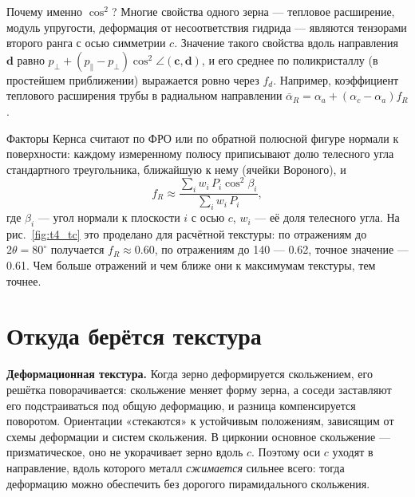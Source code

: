 
Почему именно $\cos^2$? Многие свойства одного зерна --- тепловое расширение, модуль упругости, деформация от
несоответствия гидрида --- являются тензорами второго ранга с осью симметрии $c$. Значение такого свойства вдоль
направления $\mathbf d$ равно $p_\perp + (p_\parallel - p_\perp)\cos^2\angle(\mathbf c,\mathbf d)$, и его среднее по
поликристаллу (в простейшем приближении) выражается ровно через $f_d$. Например, коэффициент теплового расширения
трубы в радиальном направлении $\bar\alpha_R = \alpha_a + (\alpha_c - \alpha_a)f_R$.

Факторы Кернса считают по ФРО или по обратной полюсной фигуре нормали к поверхности: каждому измеренному полюсу
приписывают долю телесного угла стандартного треугольника, ближайшую к нему (ячейки Вороного), и
\begin{equation}
f_R \approx \frac{\sum_i w_i\,P_i\cos^2\beta_i}{\sum_i w_i\,P_i},
\end{equation}
где $\beta_i$ --- угол нормали к плоскости $i$ с осью $c$, $w_i$ --- её доля телесного угла. На рис.~\ref{fig:t4_tc} это
проделано для расчётной текстуры: по отражениям до $2\theta = 80^\circ$ получается $f_R\approx0.60$, по отражениям до
140\textdegree{} --- 0.62, точное значение --- 0.61. Чем больше отражений и чем ближе они к максимумам текстуры, тем точнее.


\section{Откуда берётся текстура}

\textbf{Деформационная текстура.} Когда зерно деформируется скольжением, его решётка поворачивается: скольжение
меняет форму зерна, а соседи заставляют его подстраиваться под общую деформацию, и разница компенсируется
поворотом. Ориентации «стекаются» к устойчивым положениям, зависящим от схемы деформации и систем скольжения. В
цирконии основное скольжение --- призматическое, оно не укорачивает зерно вдоль $c$. Поэтому оси $c$ уходят в
направление, вдоль которого металл \emph{сжимается} сильнее всего: тогда деформацию можно обеспечить без дорогого
пирамидального скольжения.


